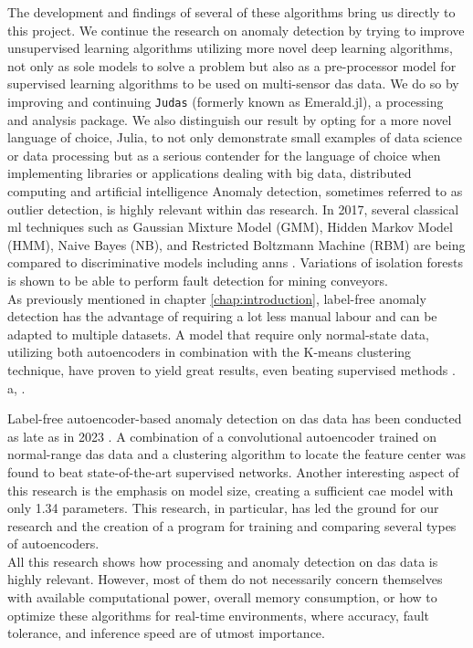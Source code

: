 The development and findings of several of these algorithms bring us directly to this project. We continue the research on anomaly detection by trying to improve unsupervised learning algorithms utilizing more novel deep learning algorithms, not only as sole models to solve a problem but also as a pre-processor model for supervised learning algorithms to be used on multi-sensor das data. We do so by improving and continuing \texttt{Judas} (formerly known as Emerald.jl), a processing and analysis package. We also distinguish our result by opting for a more novel language of choice, Julia, to not only demonstrate small examples of data science or data processing but as a serious contender for the language of choice when implementing libraries or applications dealing with big data, distributed computing and artificial intelligence
Anomaly detection, sometimes referred to as outlier detection, is highly relevant within \acrshort{das} research. In 2017, several classical \acrshort{ml} techniques such as Gaussian Mixture Model (GMM), Hidden Markov Model (HMM), Naive Bayes (NB), and Restricted Boltzmann Machine (RBM) are being compared to discriminative models including \acrshort{ann}s \cite{app7080841}. Variations of isolation forests is shown to be able to perform fault detection for mining conveyors\cite{WIJAYA2022110330}. \\

As previously mentioned in chapter \ref{chap:introduction}, label-free anomaly detection has the advantage of requiring a lot less manual labour and can be adapted to multiple datasets. A model that require only normal-state data, utilizing both autoencoders in combination with the K-means clustering technique, have proven to yield great results, even beating supervised methods \cite{s23084094}. \\ 

a, \cite{10.14778/3538598.3538602} \cite{10.1145/3444690}.

Label-free autoencoder-based anomaly detection on \acrshort{das} data has been conducted as late as in 2023 \cite{xie2023label}. A combination of a convolutional autoencoder trained on normal-range \acrshort{das} data and a clustering algorithm to locate the feature center was found to beat state-of-the-art supervised networks. Another interesting aspect of this research is the emphasis on model size, creating a sufficient \acrshort{cae} model with only \qty{1.34}{\si{\kilo}} parameters. This research, in particular, has led the ground for our research and the creation of a program for training and comparing several types of autoencoders. \\

All this research shows how processing and anomaly detection on \acrshort{das} data is highly relevant. However, most of them do not necessarily concern themselves with available computational power, overall memory consumption, or how to optimize these algorithms for real-time environments, where accuracy, fault tolerance, and inference speed are of utmost importance.